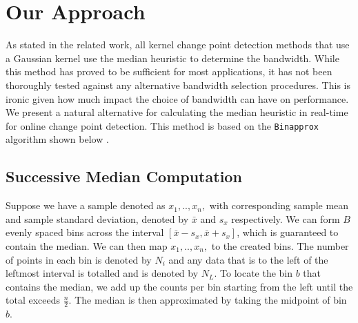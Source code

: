 
\section{Our Approach}
\label{our_approach}

As stated in the related work, all kernel change point detection methods that use a Gaussian kernel use the median heuristic to determine the bandwidth. While this method has proved to be sufficient for most applications, it has not been thoroughly tested against any alternative bandwidth selection procedures. This is ironic given how much impact the choice of bandwidth can have on performance. We present a natural alternative for calculating the median heuristic in real-time for online change point detection. This method is based on the \texttt{Binapprox} algorithm shown below \cite{tibshirani2008fast}. 

\subsection{Successive Median Computation}
Suppose we have a sample denoted as $x_1,..,x_n,$ with corresponding sample mean and sample standard deviation, denoted by $\bar{x}$ and $s_x$ respectively. We can form $B$ evenly spaced bins across the interval $[\bar{x} - s_x, \bar{x} + s_x]$, which is guaranteed to contain the median. We can then map $x_1,..,x_n,$ to the created bins. The number of points in each bin is denoted by $N_i$ and any data that is to the left of the leftmost interval is totalled and is denoted by $N_L$. To locate the bin $b$ that contains the median, we add up the counts per bin starting from the left until the total exceeds $\frac{n}{2}.$ The median is then approximated by taking the midpoint of bin $b$.

